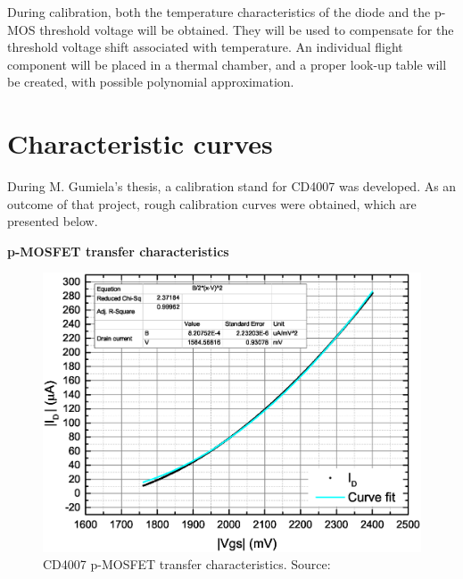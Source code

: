     During calibration, both the temperature characteristics of the diode and the p-MOS threshold voltage will be obtained. They will be used to compensate for the threshold voltage shift associated with temperature. An individual flight component will be placed in a thermal chamber, and a proper look-up table will be created, with possible polynomial approximation.

\newpage
\section{Characteristic curves}
\label{Characteristic_curves}

    During M. Gumiela's thesis, \cite{MGThesis} a calibration stand for CD4007 was developed. As an outcome of that project, rough calibration curves were obtained, which are presented below.

    \bigskip \textbf{p-MOSFET transfer characteristics}
    \begin{figure}[H]
        \centering
        \includegraphics[width=0.56\paperwidth]{img/05/mg_iv_mosfet.eps}
        \caption{CD4007 p-MOSFET transfer characteristics. Source: \cite{MGThesis}}
        \label{CD4007_p-MOSFET_transfer}
    \end{figure}

